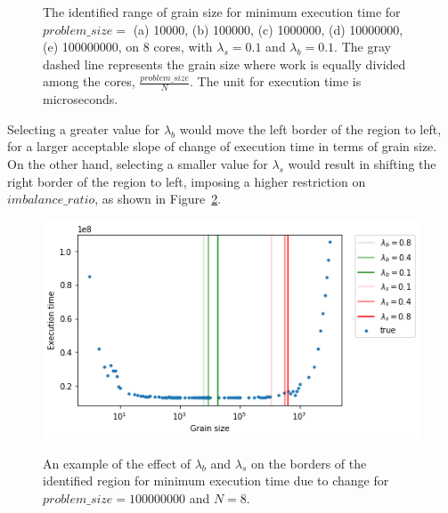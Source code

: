 \begin{figure}[H]
{		\label{fig51:d}}\hfill
	\caption{The identified range of grain size for minimum execution time for $problem\_size=$ (a) 10000, (b) 100000, (c) 1000000, (d) 10000000, (e) 100000000, on 8 cores, with $\lambda_{s}=0.1$ and $\lambda_{b}=0.1$. The gray dashed line represents the grain size where work is equally divided among the cores, $\frac{problem\_size}{N}$. The unit for execution time is microseconds.}
	\label{fig51}	
\end{figure}

Selecting a greater value for $\lambda_b$ would move the left border of the region to left, for a larger acceptable slope of change of execution time in terms of grain size. On the other hand, selecting a smaller value for $\lambda_{s}$ would result in shifting the right border of the region to left, imposing a higher restriction on $imbalance\_{ratio}$, as shown in Figure~\ref{fig65}.

\vspace{\baselineskip}	
\begin{figure}[H]
	\centering
	{\includegraphics[scale=.6]{images/hpx_for_loop/fitted/100000/marvin_100000000_8_range_10_50_80.png}}
	\caption{An example of the effect of $\lambda_b$ and $\lambda_s$ on the borders of the identified region for minimum execution time due to change for $problem\_{size}=100000000$ and $N=8$. }\label{fig65}		
\end{figure}
    


